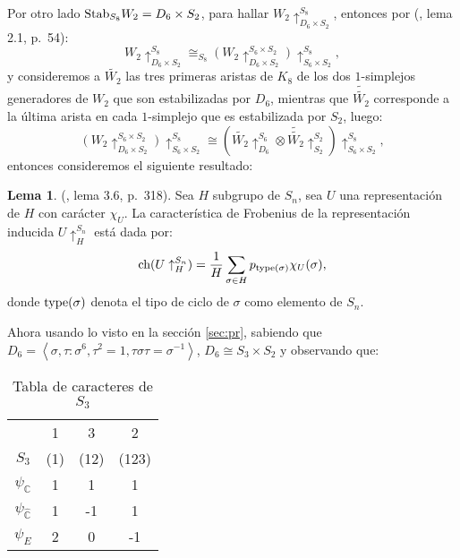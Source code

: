 \documentclass[12pt]{book}
\theoremstyle{definition}
\newtheorem{lemma}[theorem]{Lema}
\newcounter{in}
\begin{document}
Por otro lado $\textup{Stab}_{S_{8}} W_{2} = D_{6} \times S_{2}$, para hallar $W_{2} \uparrow_{ D_{6} \times S_{2}}^{S_{8}}$, entonces por (\cite{karpilovsky1990induced}, lema 2.1, p.~54):
\begin{equation}
W_{2} \uparrow_{D_{6} \times S_{2}}^{S_{8}}  \cong_{S_{8}} (W_{2} \uparrow_{D_{6} \times S_{2}}^{S_{6} \times S_{2}} ) \uparrow_{S_{6} \times S_{2}}^{S_{8}}, 
\end{equation}
y consideremos a $\tilde{W_{2}}$ las tres primeras aristas de $K_{8}$
de los dos $1$-simplejos generadores de $W_{2}$ que son estabilizadas
por $D_{6}$, mientras que $\tilde{\tilde{W_{2}}}$ corresponde a la
última arista en cada $1$-simplejo que es estabilizada por $S_{2}$,
luego:
\begin{equation}
\label{300}
(W_{2} \uparrow_{D_{6} \times S_{2}}^{S_{6} \times S_{2}} ) \uparrow_{S_{6} \times S_{2}}^{S_{8}} \cong  (\tilde{W_{2}} \uparrow_{D_{6}}^{S_{6}} \otimes \tilde{\tilde{W_{2}}} \uparrow_{S_{2}}^{S_{2}}) \uparrow_{S_{6}\times S_{2}}^{S_{8}},
\end{equation}
entonces consideremos el siguiente resultado:
\begin{lemma}{(\cite{sundaram1994plethysm}, lema 3.6, p.~318)}.
\label{sun_ch_fb}
Sea $H$ subgrupo de $S_{n}$, sea $U$ una representación de $H$ con
carácter $\chi_{U}$. La característica de Frobenius de la
representación inducida $U \uparrow_{H}^{S_{n}}$ está dada por:
$$\textup{ch}(U\uparrow_{H}^{S_{n}}) = \frac{1}{H} \sum_{\sigma \in H} p_{\textup{type}(\sigma)} \chi_{U}(\sigma),$$
donde $\textup{type}(\sigma)$ denota el tipo de ciclo de $\sigma$ como
elemento de $S_{n}$.
\end{lemma}
Ahora usando lo visto en la sección \ref{sec:pr}, sabiendo que $D_{6}=\left
\langle \sigma,\tau \colon \sigma^{6}, \tau^{2}=1, \tau \sigma \tau =
\sigma^{-1} \right \rangle$, $D_{6} \cong S_{3} \times S_{2}$ y
observando que:
\begin{table}[H]
  \centering
  \begin{tabular}{ c| c c c}
      & 1 & 3 & 2 \\
      $S_{3}$ & (1) & (12) & (123) \\
      \hline
      $\psi_{\mathbb{C}}$ & 1 & 1 & 1 \\
      $\psi_{\mathbb{\hat C}}$ & 1 & -1 & 1 \\
      $\psi_{E}$ & 2 & 0 & -1 
    \end{tabular}
    
  \caption{Tabla de caracteres de $S_{3}$}
  \label{tabla-car-S3}
\end{table}
\end{document}
